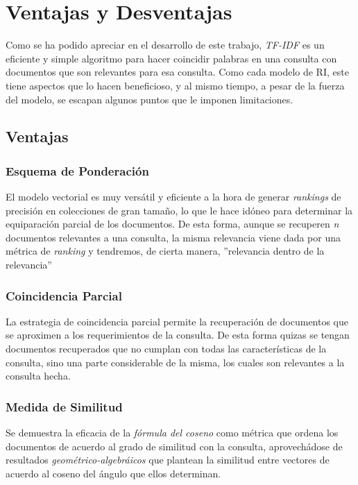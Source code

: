 \section{Ventajas y Desventajas}

Como se ha podido apreciar en el desarrollo de este trabajo, \emph{TF-IDF} es
un eficiente y simple algoritmo para hacer coincidir palabras en una consulta
con documentos que son relevantes para esa consulta. Como cada
modelo de RI, este tiene aspectos que lo hacen beneficioso, y al mismo tiempo,
a pesar de la fuerza del modelo, se escapan algunos puntos que le imponen
limitaciones.\cite{ramos, aparicio, mishra}

\subsection{Ventajas}

\subsubsection{Esquema de Ponderación}

El modelo vectorial es muy versátil y eficiente a la hora de generar
\emph{rankings} de precisión en colecciones de gran tamaño, lo que le hace
idóneo para determinar la equiparación parcial de los documentos. De esta
forma, aunque se recuperen \emph{n} documentos relevantes a una consulta, la
misma relevancia viene dada por una métrica de \emph{ranking} y tendremos, de
cierta manera, ''relevancia dentro de la relevancia''

\subsubsection{Coincidencia Parcial}

La estrategia de coincidencia parcial permite la recuperación de documentos
que se aproximen a los requerimientos de la consulta. De esta forma quizas se
tengan documentos recuperados que no cumplan con todas las características de
la consulta, sino una parte considerable de la misma, los cuales son relevantes
a la consulta hecha.

\subsubsection{Medida de Similitud}

Se demuestra la eficacia de la \emph{fórmula del coseno} como métrica que
ordena los documentos de acuerdo al grado de similitud con la consulta,
aprovechádose de resultados \emph{geométrico-algebráicos} que plantean la
similitud entre vectores de acuerdo al coseno del ángulo que ellos determinan. 

